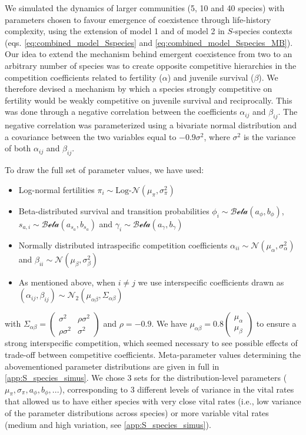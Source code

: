 \documentclass{article}
\begin{document}
We simulated the dynamics of larger communities (5, 10 and 40 species) with parameters chosen to favour emergence of coexistence through life-history complexity, using the extension of model 1 and of model 2 in $S$-species contexts (eqs. \ref{eq:combined_model_Sspecies} and \ref{eq:combined_model_Sspecies_MB}). Our idea to extend the mechanism behind emergent coexistence from two to an arbitrary number of species was to create opposite competitive hierarchies in the competition coefficients related to fertility ($\alpha$) and juvenile survival ($\beta$). We therefore devised a mechanism by which a species strongly competitive on fertility would be weakly competitive on juvenile survival and reciprocally. This was done through a negative correlation between the coefficients $\alpha_{ij}$ and $\beta_{ij}$. The negative correlation was parameterized using a bivariate normal distribution and a covariance between the two variables equal to $-0.9\sigma^2$, where $\sigma^2$ is the variance of both $\alpha_{ij}$ and $\beta_{ij}$. 

To draw the full set of parameter values, we have used:
\begin{itemize}
    \item Log-normal fertilities $\pi_i \sim \text{Log-}\mathcal{N}(\mu_\pi,\sigma_\pi^2)$
    \item Beta-distributed survival and transition probabilities $\phi_i \sim \mathcal{\text{Beta}}(a_\phi, b_\phi)$, $s_{a,i} \sim \mathcal{\text{Beta}}(a_{s_{a}}, b_{s_{a}})$ and $\gamma_i \sim \mathcal{\text{Beta}}(a_\gamma, b_\gamma)$
    \item Normally distributed intraspecific competition coefficients $\alpha_{ii} \sim \mathcal{N}(\mu_{\alpha},\sigma_{\alpha}^2)$ and $\beta_{ii} \sim \mathcal{N}(\mu_{\beta},\sigma_{\beta}^2)$
    \item As mentioned above, when $i \neq j$ we use interspecific coefficients drawn as $(\alpha_{ij},\beta_{ij}) \sim \mathcal{N}_2(\mu_{\alpha\beta},\Sigma_{\alpha\beta})$
\end{itemize}

with $\Sigma_{\alpha\beta} = 
\begin{pmatrix}
\sigma^2 & \rho \sigma^2 \\ \rho  \sigma^2 & \sigma^2
\end{pmatrix} $ and $\rho = -0.9$. We have $\mu_{\alpha\beta} = 0.8 \begin{pmatrix} \mu_{\alpha}\\ \mu_{\beta} \end{pmatrix}$ to ensure a strong interspecific competition, which seemed necessary to see possible effects of trade-off between competitive coefficients. Meta-parameter values determining the abovementioned parameter distributions are given in full in \ref{app:S_species_simus}. We chose 3 sets for the distribution-level parameters ($\mu_\pi,\sigma_\pi,a_\phi, b_\phi,...$),  corresponding to 3 different levels of variance in the vital rates that allowed us to have either species with very close vital rates (i.e., low variance of the parameter distributions across species) or more variable vital rates (medium and high variation, see \ref{app:S_species_simus}).
\end{document}
